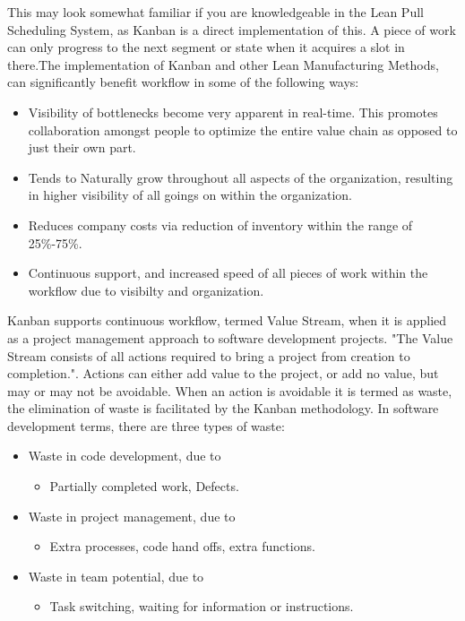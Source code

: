 This may look somewhat familiar if you are knowledgeable in the Lean Pull Scheduling System, as Kanban is a direct implementation of this\cite{kanban}. A piece of work can only progress to the next segment or state when it acquires a slot in there.The implementation of Kanban and other Lean Manufacturing Methods, can significantly benefit workflow in some of the following ways:

\begin{itemize}
\item Visibility of bottlenecks become very apparent in real-time. This promotes collaboration amongst people to optimize the entire value chain as opposed to just their own part.
\item Tends to Naturally grow throughout all aspects of the organization, resulting in higher visibility of all goings on within the organization.
\item Reduces company costs via reduction of inventory within the range of 25\%-75\%.
\item Continuous support, and increased speed of all pieces of work within the workflow due to visibilty and organization.
\end{itemize}

Kanban supports continuous workflow, termed Value Stream, when it is applied as a project management approach to software development projects. "The Value Stream consists of all actions required to bring a project from creation to completion."\cite{kanban}. Actions can either add value to the project, or add no value, but may or may not be avoidable. When an action is avoidable it is termed as waste, the elimination of waste is facilitated by the Kanban methodology. In software development terms, there are three types of waste:
\begin{itemize}
\item Waste in code development, due to
	\begin{itemize}
	\item Partially completed work, Defects.
	\end{itemize}
\item Waste in project management, due to
	\begin{itemize}
	\item Extra processes, code hand offs, extra functions.
	\end{itemize}
\item Waste in team potential, due to
	\begin{itemize}
	\item Task switching, waiting for information or instructions.
	\end{itemize}
\end{itemize}

